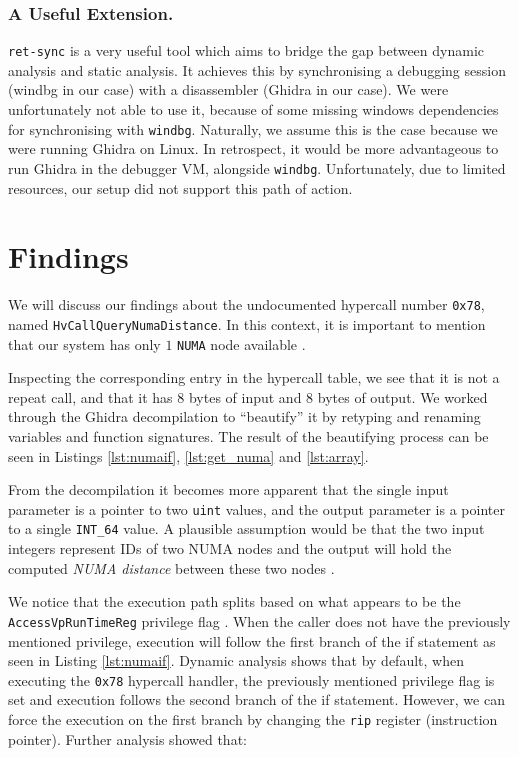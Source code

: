 \documentclass[runningheads]{llncs}
\newcommand{\cc}{\lstinline[mathescape]}
\begin{document}
\vspace{-2mm}
\subsubsection{A Useful Extension.}

\cc{ret-sync} \cite{retsync} is a very useful tool which aims to bridge the gap
between dynamic analysis and static analysis. It achieves this by synchronising
a debugging session (windbg in our case) with a disassembler (Ghidra in our
case). We were unfortunately not able to use it, because of some missing
windows dependencies for synchronising with \cc{windbg}. Naturally, we assume
this is the case because we were running Ghidra on Linux. In retrospect, it
would be more advantageous to run Ghidra in the debugger VM, alongside
\cc{windbg}. Unfortunately, due to limited resources, our setup did not support
this path of action.

\section{Findings}
\label{sec:findings}

We will discuss our findings about the undocumented hypercall number \cc{0x78},
named \cc{HvCallQueryNumaDistance}. In this context, it is important to mention
that our system has only $1$ \cc{NUMA} node available \cite{numa}.

Inspecting the corresponding entry in the hypercall table, we see that it is
not a repeat call, and that it has 8 bytes of input and 8 bytes of output. We
worked through the Ghidra decompilation to ``beautify'' it by retyping and
renaming variables and function signatures. The result of the beautifying
process can be seen in Listings \ref{lst:numaif}, \ref{lst:get_numa} and
\ref{lst:array}.

From the decompilation it becomes more apparent that the single input parameter
is a pointer to two \cc{uint} values, and the output parameter is a pointer to
a single \cc{INT_64} value. A plausible assumption would be that the two input
integers represent IDs of two NUMA nodes and the output will hold the computed
\emph{NUMA distance} between these two nodes \cite{numa}.

We notice that the execution path splits based on what appears to be the
\cc{AccessVpRunTimeReg} privilege flag \cite{tlfs}. When the caller does not
have the previously mentioned privilege, execution will follow the first branch
of the if statement as seen in Listing \ref{lst:numaif}. Dynamic analysis shows
that by default, when executing the \cc{0x78} hypercall handler, the previously
mentioned privilege flag is set and execution follows the second branch of the
if statement. However, we can force the execution on the first branch by
changing the \cc{rip} register (instruction pointer). Further analysis showed
that:
\end{document}
